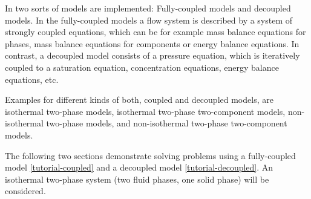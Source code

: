 In \Dumux two sorts of models are implemented: Fully-coupled models and
decoupled models. In the fully-coupled models a flow system is described by a
system of strongly coupled equations, which can be for example mass balance
equations for phases, mass balance equations for components or energy balance
equations. In contrast, a decoupled model consists of a pressure equation, which
is iteratively coupled to a saturation equation, concentration equations, energy
balance equations, etc.

Examples for different kinds of both, coupled and decoupled models, are
isothermal two-phase models, isothermal two-phase two-component models,
non-isothermal two-phase models, and non-isothermal two-phase two-component
models.

The following two sections demonstrate solving problems using a fully-coupled
model \ref{tutorial-coupled} and a decoupled model \ref{tutorial-decoupled}.
An isothermal two-phase system (two fluid phases, one solid phase) will be
considered.
